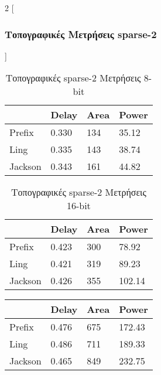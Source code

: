 \clearpage
\begin{multicols}{2}
[\subsubsection{Τοπογραφικές Μετρήσεις sparse-2}]

\begin{table}[H]
\centering
     \begin{tabular}{||p{1.2cm} | p{0.7cm} p{1cm} p{1cm} ||} 
        \hline
         & Delay & Area & Power \\ [0.5ex]
        \hline\hline
        Prefix & 0.330 & 134 & 35.12 \\
        \hline
        Ling & 0.335 & 143 & 38.74 \\
        \hline
        Jackson & 0.343 & 161 & 44.82 \\
        \hline
    \end{tabular}
\caption{Τοπογραφικές sparse-2 Μετρήσεις 8-bit}
\label{topo_sparse2_result_table_8}
\end{table}
\begin{table}[H]
\centering
     \begin{tabular}{||p{1.2cm} | p{0.7cm} p{1cm} p{1cm} ||} 
        \hline
         & Delay & Area & Power \\ [0.5ex] 
        \hline\hline
        Prefix & 0.423 & 300 & 78.92 \\
        \hline
        Ling & 0.421 & 319 & 89.23 \\
        \hline
        Jackson & 0.426 & 355 & 102.14 \\
        \hline
    \end{tabular}
\caption{Τοπογραφικές sparse-2 Μετρήσεις 16-bit}
\label{topo_sparse2_result_table_16}
\end{table}
\begin{table}[H]
\centering
     \begin{tabular}{||p{1.2cm} | p{0.7cm} p{1cm} p{1cm} ||} 
        \hline
         & Delay & Area & Power \\ [0.5ex]
        \hline\hline
        Prefix & 0.476 & 675 & 172.43 \\
        \hline
        Ling & 0.486 & 711 & 189.33 \\
        \hline
        Jackson & 0.465 & 849 & 232.75 \\
        \hline
    \end{tabular}

\end{table}
\end{multicols}
